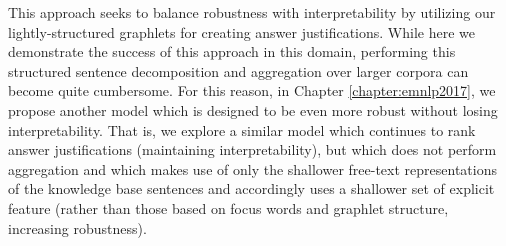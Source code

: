 This approach seeks to balance robustness with interpretability by utilizing our lightly-structured graphlets for creating answer justifications.  While here we demonstrate the success of this approach in this domain, performing this structured sentence decomposition and aggregation over larger corpora  can become quite cumbersome.  For this reason, in Chapter \ref{chapter:emnlp2017},  we propose another model which is designed to be even more robust without losing interpretability.  That is, we explore a similar model which continues to rank answer justifications (maintaining interpretability), but which does not perform aggregation and which makes use of only the shallower free-text representations of the knowledge base sentences and accordingly uses a shallower set of explicit feature (rather than those based on focus words and graphlet structure, increasing robustness).  %

